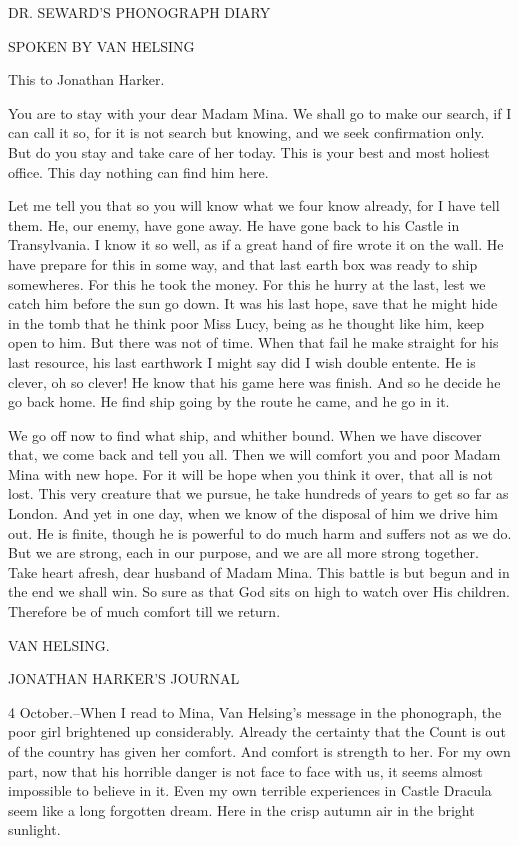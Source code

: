 DR. SEWARD'S PHONOGRAPH DIARY 

SPOKEN BY VAN HELSING 

This to Jonathan Harker. 

You are to stay with your dear Madam Mina. We shall go to make our search, if I can call it so, for it is not search but knowing, and we seek confirmation only. But do you stay and take care of her today. This is your best and most holiest office. This day nothing can find him here. 

Let me tell you that so you will know what we four know already, for I have tell them. He, our enemy, have gone away. He have gone back to his Castle in Transylvania. I know it so well, as if a great hand of fire wrote it on the wall. He have prepare for this in some way, and that last earth box was ready to ship somewheres. For this he took the money. For this he hurry at the last, lest we catch him before the sun go down. It was his last hope, save that he might hide in the tomb that he think poor Miss Lucy, being as he thought like him, keep open to him. But there was not of time. When that fail he make straight for his last resource, his last earthwork I might say did I wish double entente. He is clever, oh so clever! He know that his game here was finish. And so he decide he go back home. He find ship going by the route he came, and he go in it. 

We go off now to find what ship, and whither bound. When we have discover that, we come back and tell you all. Then we will comfort you and poor Madam Mina with new hope. For it will be hope when you think it over, that all is not lost. This very creature that we pursue, he take hundreds of years to get so far as London. And yet in one day, when we know of the disposal of him we drive him out. He is finite, though he is powerful to do much harm and suffers not as we do. But we are strong, each in our purpose, and we are all more strong together. Take heart afresh, dear husband of Madam Mina. This battle is but begun and in the end we shall win. So sure as that God sits on high to watch over His children. Therefore be of much comfort till we return. 

VAN HELSING. 

JONATHAN HARKER'S JOURNAL 

4 October.--When I read to Mina, Van Helsing's message in the phonograph, the poor girl brightened up considerably. Already the certainty that the Count is out of the country has given her comfort. And comfort is strength to her. For my own part, now that his horrible danger is not face to face with us, it seems almost impossible to believe in it. Even my own terrible experiences in Castle Dracula seem like a long forgotten dream. Here in the crisp autumn air in the bright sunlight. 

